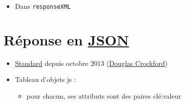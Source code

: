 \begin{itemize}
\tightlist
\item
  Dans \textenglish{\texttt{responseXML}}
\end{itemize}

\hypertarget{ruxe9ponse-en-json19}{%
\section{\texorpdfstring{Réponse en
\href{http://www.json.org/}{JSON}}{Réponse en JSON}}\label{ruxe9ponse-en-json19}}

\begin{itemize}
\tightlist
\item
  \href{http://www.ecma-international.org/publications/files/ECMA-ST/ECMA-404.pdf}{Standard}
  depuis octobre 2013 (\href{http://www.crockford.com/}{Douglas
  Crockford})
\item
  Tableau d'objets js :

  \begin{itemize}
  \tightlist
  \item
    pour chacun, ses attributs sont des paires clé:valeur
  \end{itemize}
\end{itemize}

\begin{english}

\begin{Shaded}
\begin{Highlighting}[]
\FunctionTok{\{}\FunctionTok{:} \FunctionTok{,} \FunctionTok{:} \FunctionTok{\}}
\end{Highlighting}
\end{Shaded}

\end{english}

\begin{english}

\begin{Shaded}
\begin{Highlighting}[]
\OtherTok{[}\OtherTok{,} \OtherTok{,} \OtherTok{,} \OtherTok{]}
\end{Highlighting}
\end{Shaded}

\end{english}


